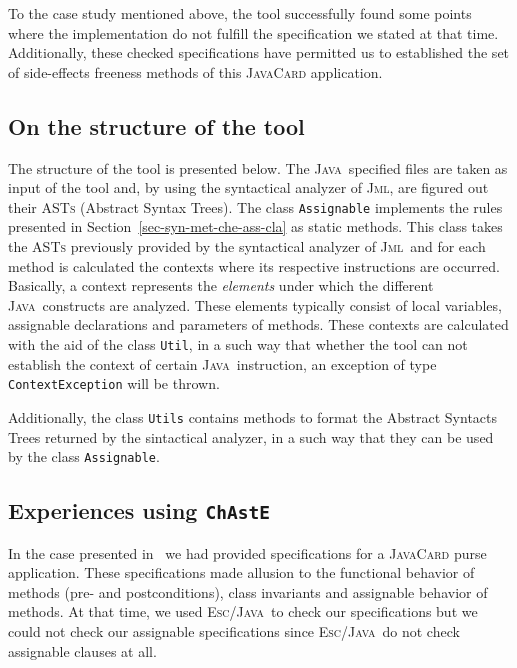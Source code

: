 \documentclass[a4paper]{llncs}
\newcommand{\jml}{\textsc{Jml}}
\newcommand{\escj}{\textsc{Esc/Java}}
\newcommand{\java}{\textsc{Java}}
\newcommand{\modtool}{\texttt{ChAstE}}
\begin{document}
To the case study mentioned above, the tool successfully found
some points where the
implementation do not fulfill the specification we stated at that
time. Additionally, these checked specifications have permitted us to
established the set of side-effects freeness methods of this
\textsc{JavaCard} application.




\subsection{On the structure of the tool}
\label{sub-on-the-str-too}
The structure of the tool is presented below. The \java~specified
files are taken as input of the tool and, by using the syntactical
analyzer of \jml, are figured out their \textsc{ASTs} (Abstract
Syntax Trees). The class \texttt{Assignable} implements the rules
presented in Section~\ref{sec-syn-met-che-ass-cla} as static
methods. This class takes the \textsc{ASTs} previously provided by the
syntactical analyzer of \jml~and for each method is
calculated the contexts where its respective instructions are
occurred. Basically, a context represents the \textit{elements} 
under which the different \java~constructs are analyzed. These
elements typically consist of local variables, assignable declarations
and parameters of methods. These contexts are calculated with the aid
of the class \texttt{Util}, in a such way that whether the tool can
not establish the context of certain \java~instruction, an exception
of type \texttt{ContextException} will be thrown.

\begin{figure}[hbt]
\centering
{}
\end{figure}

Additionally, the class \texttt{Utils} contains methods to format the
Abstract Syntacts Trees returned by the sintactical analyzer, in a
such way that they can be used by the class \texttt{Assignable}.



\subsection{Experiences using \modtool}
\label{sub-sec-usi-the-too}
In the case presented in~\cite{CatanoH02b} we had provided
specifications for a \textsc{JavaCard} purse application. These
specifications made allusion to the functional behavior of
methods (pre- and postconditions), class invariants and assignable
behavior of methods. At that time, we used \escj~to check our
specifications but we could not check our assignable specifications
since \escj~do not check assignable clauses at all. 
\end{document}
